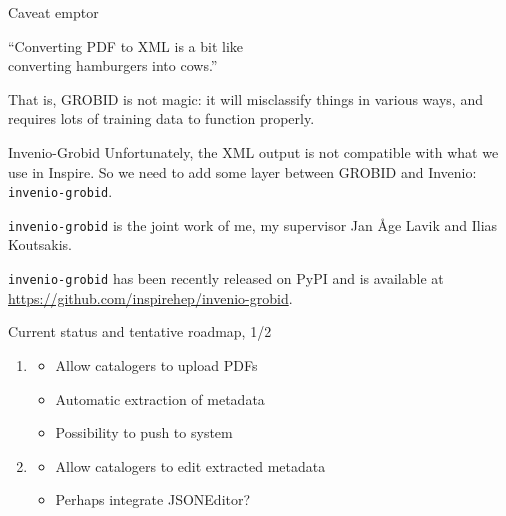 \documentclass[10pt]{beamer}
\begin{document}
  \begin{frame}{Caveat emptor}
    \begin{framed}
      ``Converting PDF to XML is a bit like\\ converting hamburgers into cows.''

      \vspace{0.25cm}

      \hspace*{}
    \end{framed}

    \vspace{0.5cm}

    That is, GROBID is not magic: it will misclassify things in various ways,
    and requires lots of training data to function properly.
  \end{frame}

  \begin{frame}{Invenio-Grobid}
    Unfortunately, the XML output is not compatible with what we use in Inspire.
    So we need to add some layer between GROBID and Invenio: \texttt{invenio-grobid}.

    \vspace{0.25cm}

    \texttt{invenio-grobid} is the joint work of me, my supervisor Jan Åge Lavik and
    Ilias Koutsakis.

    \vspace{0.25cm}

    \texttt{invenio-grobid} has been recently released on PyPI and is available at
    \url{https://github.com/inspirehep/invenio-grobid}.
  \end{frame}

  \begin{frame}[plain]
  \end{frame}

  \begin{frame}{Current status and tentative roadmap, 1/2}
    \begin{enumerate}
      \setlength\itemsep{0.5cm}
      \item \begin{itemize}
              \item Allow catalogers to upload PDFs
              \item Automatic extraction of metadata
              \item Possibility to push to system
            \end{itemize}
      \item \begin{itemize}
              \item Allow catalogers to edit extracted metadata
              \item Perhaps integrate JSONEditor?
            \end{itemize}
    \end{enumerate}
  \end{frame}
\end{document}
